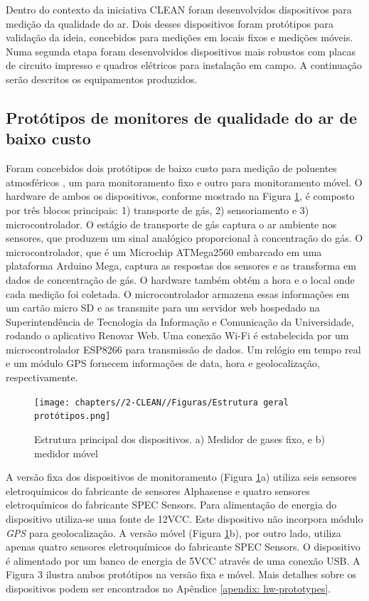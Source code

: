 Dentro do contexto da iniciativa CLEAN foram desenvolvidos dispositivos para medição da qualidade do ar. Dois desses dispositivos foram protótipos para validação da ideia, concebidos para medições em locais fixos e medições móveis. Numa segunda etapa foram desenvolvidos dispositivos mais robustos com placas de circuito impresso e quadros elétricos para instalação em campo. A continuação serão descritos os equipamentos produzidos.

\subsection{Protótipos de monitores de qualidade do ar de baixo custo}

Foram concebidos dois protótipos de baixo custo para medição de poluentes atmosféricos \cite{Campo2020DEPLOYMENTRESULTS}, um para monitoramento fixo e outro para monitoramento móvel. O hardware de ambos os dispositivos, conforme mostrado na Figura \ref{fig:device-structure}, é composto por três blocos principais: 1) transporte de gás, 2) sensoriamento e 3) microcontrolador. O estágio de transporte de gás captura o ar ambiente nos sensores, que produzem um sinal analógico proporcional à concentração do gás. O microcontrolador, que é um Microchip ATMega2560 embarcado em uma plataforma Arduino Mega, captura as respostas dos sensores e as transforma em dados de concentração de gás. O hardware também obtém a hora e o local onde cada medição foi coletada. O microcontrolador armazena essas informações em um cartão micro SD e as transmite para um servidor web hospedado na Superintendência de Tecnologia da Informação e Comunicação da Universidade, rodando o aplicativo Renovar Web. Uma conexão Wi-Fi é estabelecida por um microcontrolador ESP8266 para transmissão de dados. Um relógio em tempo real e um módulo GPS fornecem informações de data, hora e geolocalização, respectivamente.

\begin{figure}
    \centering
    \caption{Estrutura principal dos dispositivos. a) Medidor de gases fixo, e b) medidor móvel}
    \texttt{[image: chapters//2-CLEAN//Figuras/Estrutura geral protótipos.png]}
    \label{fig:device-structure}
\end{figure}

A versão fixa dos dispositivos de monitoramento (Figura \ref{fig:device-structure}a) utiliza seis sensores eletroquímicos do fabricante de sensores Alphasense e quatro sensores eletroquímicos do fabricante SPEC Sensors. Para alimentação de energia do dispositivo utiliza-se uma fonte de 12VCC. Este dispositivo não incorpora módulo \textit{GPS} para geolocalização. A versão móvel (Figura \ref{fig:device-structure}b), por outro lado, utiliza apenas quatro sensores eletroquímicos do fabricante SPEC Sensors. O dispositivo é alimentado por um banco de energia de 5VCC através de uma conexão USB. A Figura 3 ilustra ambos protótipos na versão fixa e móvel. Mais detalhes sobre os dispositivos podem ser encontrados no Apêndice \ref{apendix: hw-prototypes}.

